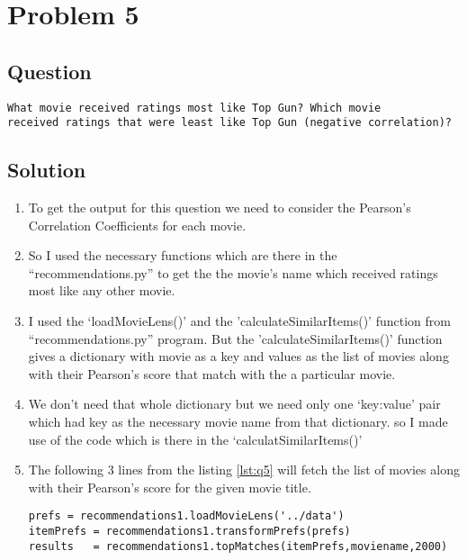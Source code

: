 \section{Problem 5}
\label{part5}
\subsection*{Question}
\begingroup
\begin{verbatim}
What movie received ratings most like Top Gun? Which movie
received ratings that were least like Top Gun (negative correlation)?
\end{verbatim}
\subsection{Solution}

\begin{enumerate}
\item To get the output for this question we need to consider the Pearson's Correlation Coefficients for each movie. 
\item So I used the necessary functions which are there in the ``recommendations.py'' to get the the movie's name which received ratings most like any other movie. 
\item I used the `loadMovieLens()'  and the 'calculateSimilarItems()' function from ``recommendations.py'' program. But the 'calculateSimilarItems()' function gives a dictionary with movie as a key and values as the list of movies along with their Pearson's score that match with the a particular movie. 
\item We don't need that whole dictionary but we need only one `key:value' pair which had key as the necessary movie name from that dictionary. so I made use of the code which is there in the `calculatSimilarItems()' 
\item The following 3 lines from the listing \ref{lst:q5} will fetch the list of movies along with their Pearson's score for the given movie title. 
\begin{lstlisting}[frame=single]
prefs = recommendations1.loadMovieLens('../data')
itemPrefs = recommendations1.transformPrefs(prefs)
results   = recommendations1.topMatches(itemPrefs,moviename,2000)
\end{lstlisting} 


\end{enumerate}
